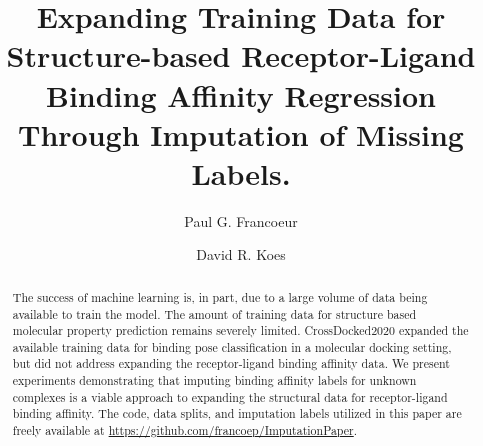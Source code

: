 \documentclass[journal=jmcmar,manuscript=article]{achemso}
\author{Paul G. Francoeur}
\author{David R. Koes}
\affiliation[Pitt]{Department of Computational and Systems Biology, University of Pittsburgh, Pittsburgh, PA 15260}
\title[Imputation for Binding Affinity Regression]{Expanding Training Data for Structure-based Receptor-Ligand Binding Affinity Regression Through Imputation of Missing Labels.}
\begin{document}
\begin{tocentry}




\end{tocentry}

\begin{abstract}
The success of machine learning is, in part, due to a large volume of data being available to train the model.
The amount of training data for structure based molecular property prediction remains severely limited.
CrossDocked2020 expanded the available training data for binding pose classification in a molecular docking setting, but did not address expanding the receptor-ligand binding affinity data.
We present experiments demonstrating that imputing binding affinity labels for unknown complexes is a viable approach to expanding the structural data for receptor-ligand binding affinity.
The code, data splits, and imputation labels utilized in this paper are freely available at \url{https://github.com/francoep/ImputationPaper}.
\end{abstract}

\end{document}
